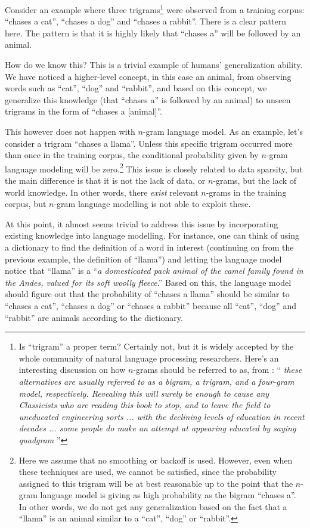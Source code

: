 \documentclass{report}
\begin{document}
Consider an example where three trigrams\footnote{
    Is ``trigram'' a proper term? Certainly not, but it is widely accepted by
    the whole community of natural language processing researchers. Here's an
    interesting discussion on how $n$-grams should be referred to as, from
    \cite{manning1999foundations}: ``{\it 
        these
        alternatives are usually referred to as a bigram, a trigram, and a
        four-gram model, respectively. Revealing this will surely be enough to
        cause any Classicists who are reading this book to stop, and to leave
        the field to uneducated engineering sorts ... with the declining levels
        of education in recent decades ... some people do make an attempt at
        appearing educated by saying quadgram
    }'' 
} were observed from a training corpus: ``chases a cat'', ``chases a dog'' and
``chases a rabbit''. There is a clear pattern here. The pattern is that it is
highly likely that ``chases a'' will be followed by an animal. 

How do we know this? This is a trivial example of humans' generalization
ability. We have noticed a higher-level concept, in this case an animal, from
observing words such as ``cat'', ``dog'' and ``rabbit'', and based on this
concept, we generalize this knowledge (that ``chases a'' is followed by an
animal) to unseen trigrams in the form of ``chases a [animal]''.

This however does not happen with $n$-gram language model. As an example, let's
consider a trigram ``chases a llama''. Unless this specific trigram occurred
more than once in the training corpus, the conditional probability given by 
$n$-gram language modeling will be zero.\footnote{
    Here we assume that no smoothing or backoff is used. However, even when
    these techniques are used, we cannot be satisfied, since the probability
    assigned to this trigram will be at best reasonable up to the point that the
    $n$-gram language model is giving as high probability as the bigram ``chases
    a''. In other words, we do not get any generalization based on the fact that
    a ``llama'' is an animal similar to a ``cat'', ``dog'' or ``rabbit''.
} This issue is closely related to data sparsity, but the main difference is
that it is not the lack of data, or $n$-grams, but the lack of world knowledge.
In other words, there {\em exist} relevant $n$-grams in the training corpus, but
$n$-gram language modelling is not able to exploit these.

At this point, it almost seems trivial to address this issue by incorporating
existing knowledge into language modelling. For instance, one can think of using
a dictionary to find the definition of a word in interest (continuing on from
the previous example, the definition of ``llama'') and letting the language
model notice that ``llama'' is a ``{\em a domesticated pack animal of the camel
family found in the Andes, valued for its soft woolly fleece}.'' Based on this,
the language model should figure out that the probability of ``chases a llama''
should be similar to ``chases a cat'', ``chases a dog'' or ``chases a rabbit''
because all ``cat'', ``dog'' and ``rabbit'' are animals according to the
dictionary.
\end{document}
